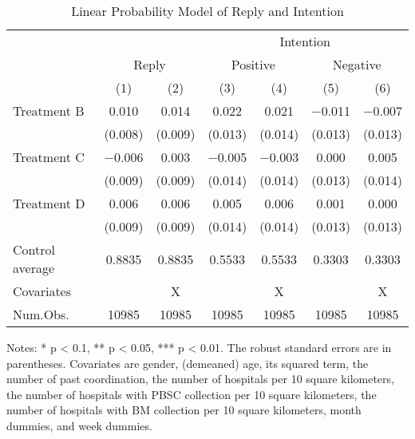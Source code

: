 \documentclass[12pt, a4paper]{article}
\begin{document}
\begin{table}[H]

\caption{\label{tab:reg-stock}Linear Probability Model of Reply and Intention}
\centering
\fontsize{9}{11}\selectfont
\begin{threeparttable}
\begin{tabular}[t]{lcccccc}
\toprule
\multicolumn{3}{c}{ } & \multicolumn{4}{c}{Intention} \\
\cmidrule(l{3pt}r{3pt}){4-7}
\multicolumn{1}{c}{ } & \multicolumn{2}{c}{Reply} & \multicolumn{2}{c}{Positive} & \multicolumn{2}{c}{Negative} \\
\cmidrule(l{3pt}r{3pt}){2-3} \cmidrule(l{3pt}r{3pt}){4-5} \cmidrule(l{3pt}r{3pt}){6-7}
  & (1) & (2) & (3) & (4) & (5) & (6)\\
\midrule
Treatment B & \num{0.010} & \num{0.014} & \num{0.022} & \num{0.021} & \num{-0.011} & \num{-0.007}\\
 & (\num{0.008}) & (\num{0.009}) & (\num{0.013}) & (\num{0.014}) & (\num{0.013}) & (\num{0.013})\\
Treatment C & \num{-0.006} & \num{0.003} & \num{-0.005} & \num{-0.003} & \num{0.000} & \num{0.005}\\
 & (\num{0.009}) & (\num{0.009}) & (\num{0.014}) & (\num{0.014}) & (\num{0.013}) & (\num{0.014})\\
Treatment D & \num{0.006} & \num{0.006} & \num{0.005} & \num{0.006} & \num{0.001} & \num{0.000}\\
 & (\num{0.009}) & (\num{0.009}) & (\num{0.014}) & (\num{0.014}) & (\num{0.013}) & (\num{0.013})\\
\midrule
Control average & 0.8835 & 0.8835 & 0.5533 & 0.5533 & 0.3303 & 0.3303\\
Covariates &  & X &  & X &  & X\\
Num.Obs. & \num{10985} & \num{10985} & \num{10985} & \num{10985} & \num{10985} & \num{10985}\\
\bottomrule
\end{tabular}
\begin{tablenotes}
\item Notes: * p < 0.1, ** p < 0.05, *** p < 0.01. The robust standard errors are in parentheses. Covariates are gender, (demeaned) age, its squared term, the number of past coordination, the number of hospitals per 10 square kilometers, the number of hospitals with PBSC collection per 10 square kilometers, the number of hospitals with BM collection per 10 square kilometers, month dummies, and week dummies.
\end{tablenotes}
\end{threeparttable}
\end{table}
\end{document}
